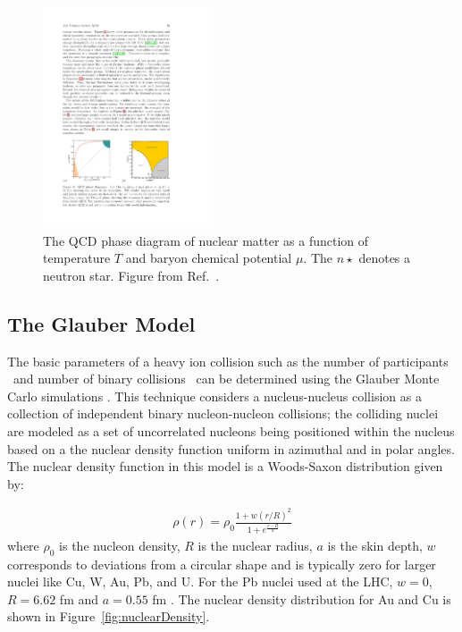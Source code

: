 \begin{figure}[htbp]
\begin{center}
\includegraphics[width=0.45\textwidth]{figures/theory/qcd_phase}
\caption{The QCD phase diagram of nuclear matter as a function of temperature $T$ and baryon chemical potential $\mu$.
The $n\star$ denotes a neutron star.
Figure from Ref.~\cite{Kronfeld:2012uk}.}
\label{fig:qcd_phase}
\end{center}
\end{figure}


\subsection{The Glauber Model}
The basic parameters of a heavy ion collision such as the number of participants \Npart\ and number of binary collisions \Ncoll\ can be determined using the Glauber Monte Carlo simulations \cite{glauberArticle}.
This technique considers a nucleus-nucleus collision as a collection of independent binary nucleon-nucleon collisions; the colliding nuclei are modeled as a set of uncorrelated nucleons being positioned within the nucleus based on a the nuclear density function uniform in azimuthal and in polar angles.
The nuclear density function in this model is a Woods-Saxon distribution given by: 

\begin{align}
\rho(r) = \rho_0 \frac{1 + w (r/R)^2}{1+e^{\frac{r-R}{a}}}
\end{align}
where $\rho_0$ is the nucleon density, $R$ is the nuclear radius, $a$ is the skin depth, $w$ corresponds to deviations from a circular shape and is typically zero for larger nuclei like Cu, W, Au, Pb, and U.
For the Pb nuclei used at the LHC, $w = 0$, $R = 6.62$ fm and $a =0.55$ fm \cite{DEVRIES1987495}.
The nuclear density distribution for Au and Cu is shown in Figure~\ref{fig:nuclearDensity}.

